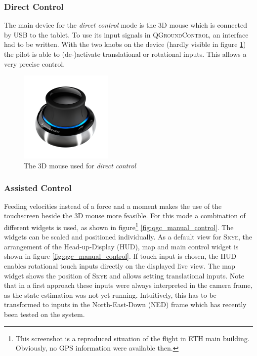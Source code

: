 \subsubsection{Direct Control}
The main device for the \textit{direct control} mode is the 3D mouse which is connected by USB to the tablet. To use its input signals in  \textsc{QGroundControl}, an interface had to be written. With the two knobs on the device (hardly visible in figure \ref{fig:3D_mouse}) the pilot is able to (de-)activate translational or rotational inputs. This allows a very precise control.

\begin{figure}[H] %
	\begin{center}
		\includegraphics[width=0.4\textwidth]{3dx_productimage}
		\caption{The 3D mouse used for \textit{direct control}}  
		\label{fig:3D_mouse}
	\end{center}
\end{figure}

\subsubsection{Assisted Control}
\label{subsub:assistedcontrol}
Feeding velocities instead of a force and a moment makes the use of the touchscreen beside the 3D mouse more feasible. For this mode a combination of different widgets is used, as shown in figure\footnote{This screenshot is a reproduced situation of the flight in ETH main building. Obviously, no GPS information were available then.} \ref{fig:qgc_manual_control}. The widgets can be scaled and positioned individually. As a default view for \textsc{Skye}, the arrangement of the Head-up-Display (HUD), map and main control widget is shown in figure \ref{fig:qgc_manual_control}. If touch input is chosen, the HUD enables rotational touch inputs directly on the displayed live view. The map widget shows the position of \textsc{Skye} and allows setting translational inputs. Note that in a first approach these inputs were always interpreted in the camera frame, as the state estimation was not yet running. Intuitively, this has to be transformed to inputs in the North-East-Down (NED) frame which has recently been tested on the system.

